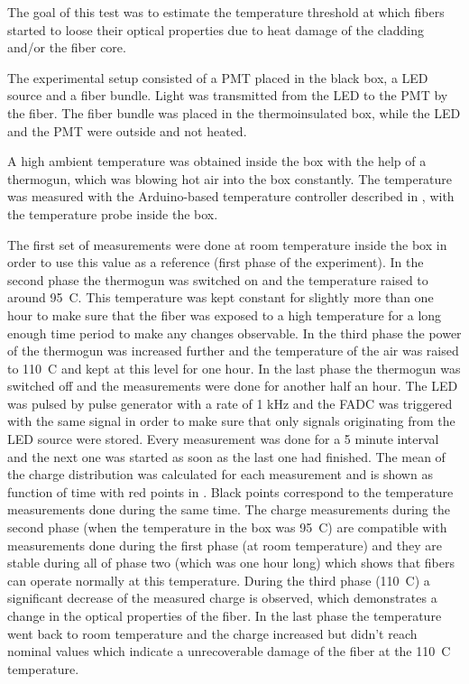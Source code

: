 The goal of this test was to estimate the temperature threshold at which fibers started to loose their optical properties
due to heat damage of the cladding and/or the fiber core.

The experimental setup consisted of a PMT placed in the black box, a LED source and a fiber bundle.
Light was transmitted from the LED to the PMT by the fiber.
The fiber bundle was placed in the thermoinsulated box, while the LED and the PMT were outside and not heated.

A high ambient temperature was obtained inside the box with the help of a thermogun, which was blowing hot air into the box constantly.
The temperature was measured with the Arduino-based temperature controller described in , with the temperature probe inside the box.

The first set of measurements were done at room temperature inside the box in order to use this value as a reference (first phase of the experiment).
In the second phase the thermogun was switched on and the temperature raised to around 95\degree~C.
This temperature was kept constant for slightly more than one hour to make sure that the fiber was exposed to a high temperature for
a long enough time period to make any changes observable. 
In the third phase the power of the thermogun was increased further and the temperature of the air was raised to 110\degree~C and kept at this level for one hour.
In the last phase the thermogun was switched off and the measurements were done for another half an hour.
The LED was pulsed by pulse generator with a rate of 1 kHz and the FADC was triggered 
with the same signal in order to make sure that only signals originating from the LED source were stored.
Every measurement was done for a 5 minute interval and the next one was started as soon as the last one had finished.
The mean of the charge distribution was calculated for each measurement and is shown as function of time with red points in .
Black points correspond to the temperature measurements done during the same time.
The charge measurements during the second phase (when the temperature in the box was 95\degree~C) are compatible with measurements done during the first phase 
(at room temperature) and they are stable during all of phase two (which was one hour long) which shows that fibers can operate normally at this temperature.
During the third phase (110\degree~C) a significant decrease of the measured charge is observed, which demonstrates a change in the
optical properties of the fiber. In the last phase the temperature went back to room temperature and the charge increased but didn't reach 
nominal values which indicate a unrecoverable damage of the fiber at the 110\degree~C temperature.

